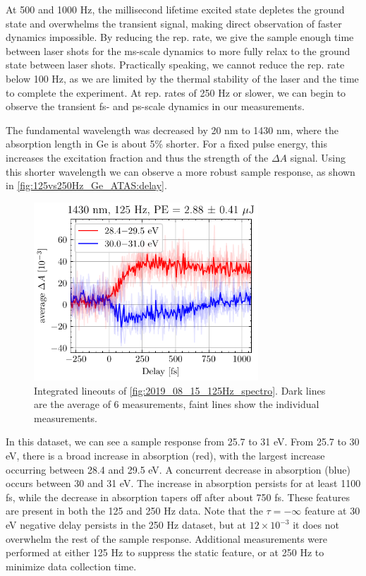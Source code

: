 At 500 and 1000 Hz, the millisecond lifetime excited state depletes the ground state and overwhelms the transient signal, making direct observation of faster dynamics impossible. By reducing the rep. rate, we give the sample enough time between laser shots for the ms-scale dynamics to more fully relax to the ground state between laser shots. Practically speaking, we cannot reduce the rep. rate below 100 Hz, as we are limited by the thermal stability of the laser and the time to complete the experiment. At rep. rates of 250 Hz or slower, we can begin to observe the transient fs- and ps-scale dynamics in our measurements.

The fundamental wavelength was decreased by 20 nm to 1430 nm, where the absorption length in Ge is about 5\% shorter. For a fixed pulse energy, this increases the excitation fraction and thus the strength of the $\Delta A$ signal. Using this shorter wavelength we can observe a more robust sample response, as shown in \cref{fig:125vs250Hz_Ge_ATAS:delay}.

\begin{figure}
	\centering
	\includegraphics[width=0.75\textwidth]{figures/chap4/Delay123456_1430nm_125Hz_2p88uJ_AvgBands.pdf}
	\caption{Integrated lineouts of \cref{fig:2019_08_15_125Hz_spectro}. Dark lines are the average of 6 measurements, faint lines show the individual measurements.}
	\label{fig:Delay123456_1430nm_125Hz_2p88uJ_AvgBands}
\end{figure}

In this dataset, we can see a sample response from 25.7 to 31 eV. From 25.7 to 30 eV, there is a broad increase in absorption (red), with the largest increase occurring between 28.4 and 29.5 eV. A concurrent decrease in absorption (blue) occurs between 30 and 31 eV. The increase in absorption persists for at least 1100 fs, while the decrease in absorption tapers off after about 750 fs. These features are present in both the 125 and 250 Hz data. Note that the $\tau=-\infty$ feature at 30 eV negative delay persists in the 250 Hz dataset, but at $12 \times 10^{-3}$ it does not overwhelm the rest of the sample response. Additional measurements were performed at either 125 Hz to suppress the static feature, or at 250 Hz to minimize data collection time.

